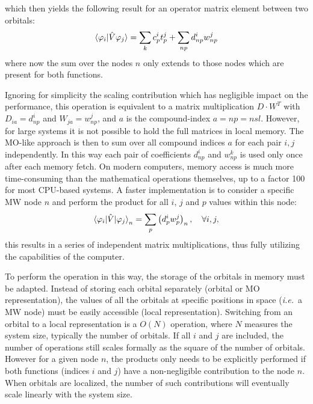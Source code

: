 \documentclass[journal=jctcce, manuscript=article]{achemso}
\begin{document}
which then yields the following result for an operator matrix element between two orbitals:
\begin{equation}
  \braket{\varphi_i|{\hat V} \varphi_j} = \sum_{k} c^i_{p} t^j_{p} + \sum_{np} d^i_{np} w^j_{np}
\end{equation}
where now the sum over the nodes $n$ only extends to those nodes which are present for both functions.

Ignoring for simplicity the scaling contribution which has negligible impact on the performance, this operation is equivalent to a matrix multiplication $D \cdot W^T$ with $D_{ia} = d^i_{np}$ and $W_{ja} = w^j_{np}$, and $a$ is the compound-index $a=np=nsl$. However, for large systems it is not possible to hold the full matrices in local memory.
The \ac{MO}-like approach is then to sum over all compound indices $a$ for each pair $i,j$ independently. In this way each pair of coefficients $d^i_{np}$ and $w^k_{np}$ is used only once after each memory fetch. On modern computers, memory access is much more time-consuming than the mathematical operations themselves, up to a factor 100 for most CPU-based systems. A faster implementation is to consider a specific \ac{MW} node $n$ and perform the product for all $i$, $j$ and $p$ values within this node:
\begin{equation}\label{equ:sum}
  \braket{\varphi_i | {\hat V} |\varphi_j}_{n} 
  = \sum_{p} \left(d^i_{p} w^j_{p}\right)_{n}, \quad\forall i,j,
\end{equation}
this results in a series of independent matrix multiplications, thus fully utilizing the capabilities of the computer. 

To perform the operation in this way, the storage of the orbitals in memory must be adapted. Instead of storing each orbital separately (orbital or MO representation), the values of all the orbitals at specific positions in space (\emph{i.e.}~a \ac{MW} node) must be easily accessible (local representation). Switching from an orbital to a local representation is a $O(N)$ operation, where $N$ measures the system size, typically the number of orbitals.
If all $i$ and $j$ are included, the number of operations still scales formally as the square of the number of orbitals. However for a given node $n$, the products only needs to be explicitly performed if both functions (indices $i$ and $j$) have a non-negligible contribution to the node $n$. When orbitals are localized, the number of such contributions will eventually scale linearly with the system size.
\end{document}
